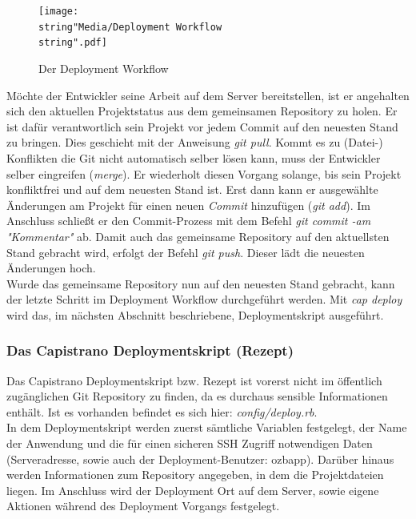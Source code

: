 \documentclass[12pt,             %
               a4paper,          %
               listof=totoc,     %
               index=totoc,      %
               bibliography=totoc,%
               oneside,         %
               BCOR1cm,          %
               english   %
               ]{scrbook}
\begin{document}
\begin{figure}[H]
     \begin{center}
          \texttt{[image: \\string"Media/Deployment Workflow\\string".pdf]}
     \end{center}
     \caption{Der Deployment Workflow}
     \label{fig:deployment_workflow}
\end{figure} 

Möchte der Entwickler seine Arbeit auf dem Server bereitstellen, ist er angehalten sich den aktuellen Projektstatus aus dem gemeinsamen Repository zu holen. Er ist dafür verantwortlich sein Projekt vor jedem Commit auf den neuesten Stand zu bringen. Dies geschieht mit der Anweisung \textit{git pull}. Kommt es zu (Datei-) Konflikten die Git nicht automatisch selber lösen kann, muss der Entwickler selber eingreifen (\textit{merge}). Er wiederholt diesen Vorgang solange, bis sein Projekt konfliktfrei und auf dem neuesten Stand ist. Erst dann kann er ausgewählte Änderungen am Projekt für einen neuen \textit{Commit} hinzufügen (\textit{git add}). Im Anschluss schließt er den Commit-Prozess mit dem Befehl \textit{git commit -am "Kommentar"} ab. Damit auch das gemeinsame Repository auf den aktuellsten Stand gebracht wird, erfolgt der Befehl \textit{git push}. Dieser lädt die neuesten Änderungen hoch.\\

Wurde das gemeinsame Repository nun auf den neuesten Stand gebracht, kann der letzte Schritt im Deployment Workflow durchgeführt werden. Mit \textit{cap deploy} wird das, im nächsten Abschnitt beschriebene, Deploymentskript ausgeführt. 

\subsubsection{Das Capistrano Deploymentskript (Rezept)}\label{subsec:deployment_recipe}
Das Capistrano Deploymentskript bzw. Rezept ist vorerst nicht im öffentlich zugänglichen Git Repository zu finden, da es durchaus sensible Informationen enthält. Ist es vorhanden befindet es sich hier: \textit{config/deploy.rb}.\\
In dem Deploymentskript werden zuerst sämtliche Variablen festgelegt, der Name der Anwendung und die für einen sicheren SSH Zugriff notwendigen Daten (Serveradresse, sowie auch der Deployment-Benutzer: \glqq ozbapp\grqq). Darüber hinaus werden Informationen zum Repository angegeben, in dem die Projektdateien liegen. Im Anschluss wird der Deployment Ort auf dem Server, sowie eigene Aktionen während des Deployment Vorgangs festgelegt.
\end{document}
